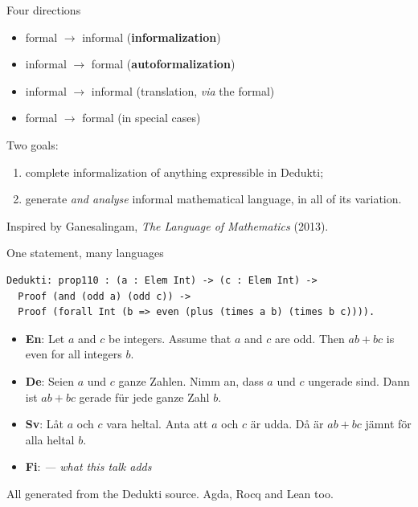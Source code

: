 \documentclass[10pt,aspectratio=169]{beamer}
\begin{document}
\begin{frame}{Four directions}
  \begin{itemize}
    \item formal $\rightarrow$ informal \quad (\textbf{informalization})
    \item informal $\rightarrow$ formal \quad (\textbf{autoformalization})
    \item informal $\rightarrow$ informal \quad (translation, \emph{via} the formal)
    \item formal $\rightarrow$ formal \quad (in special cases)
  \end{itemize}

  \vspace{1em}
  Two goals:
  \begin{enumerate}
    \item complete informalization of anything expressible in Dedukti;
    \item generate \emph{and analyse} informal mathematical language,
          in all of its variation.
  \end{enumerate}

  \vspace{0.5em}
  \small Inspired by Ganesalingam, \emph{The Language of Mathematics} (2013).
\end{frame}

\begin{frame}[fragile]{One statement, many languages}
\begin{lstlisting}
Dedukti: prop110 : (a : Elem Int) -> (c : Elem Int) ->
  Proof (and (odd a) (odd c)) ->
  Proof (forall Int (b => even (plus (times a b) (times b c)))).
\end{lstlisting}

\vspace{-0.2em}
\begin{itemize}\footnotesize
  \item \textbf{En}: Let $a$ and $c$ be integers. Assume that $a$ and $c$ are odd.
        Then $ab + bc$ is even for all integers $b$.
  \item \textbf{De}: Seien $a$ und $c$ ganze Zahlen. Nimm an, dass $a$ und $c$ ungerade sind.
        Dann ist $ab + bc$ gerade für jede ganze Zahl $b$.
  \item \textbf{Sv}: Låt $a$ och $c$ vara heltal. Anta att $a$ och $c$ är udda.
        Då är $ab + bc$ jämnt för alla heltal $b$.
  \item \alert{\textbf{Fi}: \emph{--- what this talk adds}}
  \end{itemize}

  \vspace{0.2em}
  \footnotesize All generated from the Dedukti source. Agda, Rocq and Lean too.
\end{frame}
\end{document}
